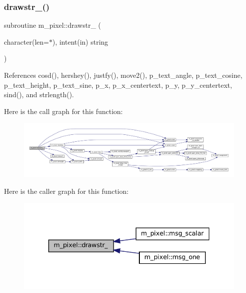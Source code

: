 \subsubsection{\texorpdfstring{drawstr\+\_\+()}{drawstr\_()}}
{\footnotesize\ttfamily subroutine m\+\_\+pixel\+::drawstr\+\_\+ (\begin{DoxyParamCaption}\item[{character(len=$\ast$), intent(in)}]{string }\end{DoxyParamCaption})\hspace{0.3cm}{\ttfamily [private]}}



References cosd(), hershey(), justfy(), move2(), p\+\_\+text\+\_\+angle, p\+\_\+text\+\_\+cosine, p\+\_\+text\+\_\+height, p\+\_\+text\+\_\+sine, p\+\_\+x, p\+\_\+x\+\_\+centertext, p\+\_\+y, p\+\_\+y\+\_\+centertext, sind(), and strlength().

Here is the call graph for this function\+:
\nopagebreak
\begin{figure}[H]
\begin{center}
\leavevmode
\includegraphics[width=350pt]{namespacem__pixel_a3f8850328e359af5802954b2f70652f5_cgraph}
\end{center}
\end{figure}
Here is the caller graph for this function\+:
\nopagebreak
\begin{figure}[H]
\begin{center}
\leavevmode
\includegraphics[width=337pt]{namespacem__pixel_a3f8850328e359af5802954b2f70652f5_icgraph}
\end{center}
\end{figure}
\mbox{\label{namespacem__pixel_a566adb827a3a26ba42d4e86e4c6e12af}} 
